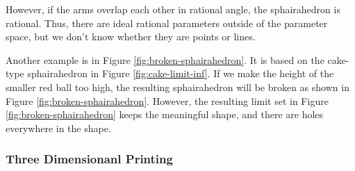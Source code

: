 However, if the arms overlap each other in rational angle, the
sphairahedron is rational.
Thus, there are ideal rational parameters outside of the parameter
space, but we don't know whether they are points or lines.

Another example is in Figure \ref{fig:broken-sphairahedron}.
It is based on the cake-type sphairahedron in Figure \ref{fig:cake-limit-inf}.
If we make the height of the smaller red ball too high, the resulting
sphairahedron will be broken as shown in Figure
\ref{fig:broken-sphairahedron}.
However, the resulting limit set in Figure
\ref{fig:broken-sphairahedron} keeps the
meaningful shape, and there are holes everywhere in the shape.

\subsubsection{Three Dimensionanl Printing}

